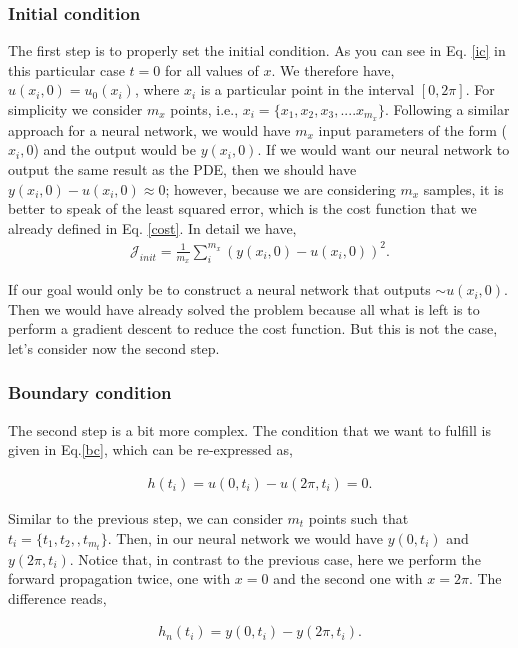 \documentclass{article}
\begin{document}
\subsubsection{Initial condition}

The first step is to properly set the initial condition. As you can see in Eq. \eqref{ic} in this particular case $t=0$ for all values of $x$. We therefore have, $u(x_i,0) = u_0(x_i)$, where $x_i$ is a particular point in the interval $[0,2\pi]$. For simplicity we consider $m_x$ points, i.e., $x_i = \{x_1,x_2,x_3,....x_{m_x}\}$. Following a similar approach for a neural network, we would have $m_x$ input parameters of the form ($x_i,0$) and the output would be $y(x_i,0)$. If we would want our neural network to output the same result as the PDE, then we should have $y(x_i,0) - u(x_i,0) \approx 0$; however, because we are considering $m_x$ samples, it is better to speak of the least squared error, which is the cost function that we already defined in Eq. \eqref{cost}. In detail we have,
\begin{align}
\mathcal{J}_{init}=\frac{1}{m_x}\sum_i^{m_x} (y(x_i,0) - u(x_i,0))^2.
\end{align}

If our goal would only be to construct a neural network that outputs $\sim u(x_i,0)$. Then we would have already solved the problem because all what is left is to perform a gradient descent to reduce the cost function. But this is not the case, let's consider now the second step.

\subsubsection{Boundary condition}
The second step is a bit more complex. The condition that we want to fulfill is given in Eq.\eqref{bc}, which can be re-expressed as,

\begin{align}
\label{h_bc}
h(t_i)= u(0,t_i) - u(2\pi,t_i) = 0.
\end{align}

Similar to the previous step, we can consider $m_t$ points such that $t_i = \{ t_1,t_2,,t_{m_t}\}$. Then, in our neural network we would have $y(0,t_i)$ and $y(2\pi,t_i)$. Notice that, in contrast to the previous case, here we perform the forward propagation twice, one with $x=0$ and the second one with $x=2\pi$. The difference reads,

\begin{align}
h_{n}(t_i)= y(0,t_i) - y(2\pi,t_i).
\end{align}
\end{document}
